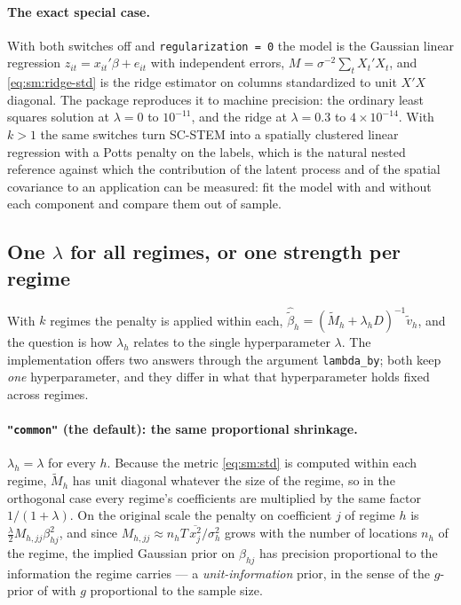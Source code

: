 \documentclass[11pt]{article}
\begin{document}
\paragraph{The exact special case.} With both switches off and \texttt{regularization = 0} the model is the Gaussian linear regression $z_{it} = x_{it}'\beta + e_{it}$ with independent errors, $M = \sigma^{-2}\sum_t X_t'X_t$, and \eqref{eq:sm:ridge-std} is the ridge estimator on columns standardized to unit $X'X$ diagonal. The package reproduces it to machine precision: the ordinary least squares solution at $\lambda = 0$ to $10^{-11}$, and the ridge at $\lambda = 0.3$ to $4\times10^{-14}$. With $k > 1$ the same switches turn SC-STEM into a spatially clustered linear regression with a Potts penalty on the labels, which is the natural nested reference against which the contribution of the latent process and of the spatial covariance to an application can be measured: fit the model with and without each component and compare them out of sample.

\subsection{One \texorpdfstring{$\lambda$}{lambda} for all regimes, or one strength per regime}

With $k$ regimes the penalty is applied within each, $\hat{\tilde\beta}_h = (\tilde M_h + \lambda_h D)^{-1}\tilde v_h$, and the question is how $\lambda_h$ relates to the single hyperparameter $\lambda$. The implementation offers two answers through the argument \texttt{lambda\_by}; both keep \emph{one} hyperparameter, and they differ in what that hyperparameter holds fixed across regimes.

\paragraph{\texttt{"common"} (the default): the same proportional shrinkage.} $\lambda_h = \lambda$ for every $h$. Because the metric \eqref{eq:sm:std} is computed within each regime, $\tilde M_h$ has unit diagonal whatever the size of the regime, so in the orthogonal case every regime's coefficients are multiplied by the same factor $1/(1+\lambda)$. On the original scale the penalty on coefficient $j$ of regime $h$ is $\tfrac{\lambda}{2} M_{h,jj}\beta_{hj}^2$, and since $M_{h,jj} \approx n_h T\,\overline{x^2_j}/\sigma^2_h$ grows with the number of locations $n_h$ of the regime, the implied Gaussian prior on $\beta_{hj}$ has precision proportional to the information the regime carries --- a \emph{unit-information} prior, in the sense of the $g$-prior of \citet{Zellner1986} with $g$ proportional to the sample size.
\end{document}
